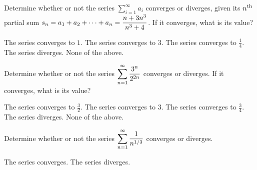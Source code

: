 \documentclass[12pt]{exam}
\newcommand{\ds}{\ensuremath{\displaystyle}}
\begin{document}
\begin{center}
\end{center}
\vspace{0.1in}

\begin{questions}

\setcounter{question}{0}
\question[10]
Determine whether or not the series $\sum_{i=1}^\infty a_i$ converges or
diverges, given its $n^{\rm th}$ partial sum
$\ds s_n = a_1 + a_2 + \cdots + a_n = \frac{n+3n^3}{n^3+4}$. If it converges,
what is its value?

\begin{checkboxes}
\choice The series converges to $1$.
\CorrectChoice The series converges to $3$.
\choice The series converges to $\frac{1}{4}$.
\choice The series diverges.
\choice None of the above.
\end{checkboxes}

\vfill

\question[10]
Determine whether or not the series $\ds\sum_{n=1}^\infty \frac{3^n}{2^{2n}}$
converges or diverges. If it converges, what is its value?

\begin{checkboxes}
\choice The series converges to $\frac{3}{2}$.
\CorrectChoice The series converges to $3$.
\choice The series converges to $\frac{3}{4}$.
\choice The series diverges.
\choice None of the above.
\end{checkboxes}

\vfill

\question[5]
Determine whether or not the series $\ds\sum_{n=1}^{\infty} \frac{1}{n^{1/3}}$
converges or diverges.

\begin{checkboxes}
\choice The series converges.
\CorrectChoice The series diverges.
\end{checkboxes}

\vfill

\end{questions}
\end{document}
